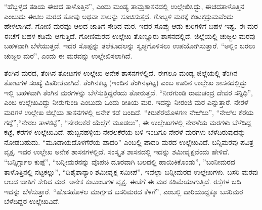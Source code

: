 “ಹೆಬ್ಬಳ್ಳದ ತಡಿಯ ಈಚದ ತಾಳೊತ್ತಿನ”, ಎಂದು ಮಂಡ್ಯ ತಾಮ್ರಶಾಸನದಲ್ಲಿ ಉಲ್ಲೇಖಿಸಿದ್ದು, ಈಚದ\break ತಾಳೊತ್ತಿನ ಎಂಬುದು ಈಚಲ ಮರದ ತೋಪು ಅಥವಾ ಸಾಲನ್ನು ಸೂಚಿಸುತ್ತದೆ. ಗೊಬ್ಬಳಿ ಮರಕ್ಕೆ ಕಂಟಕದ್ರುಮವೆಂದು ಹೇಳಲಾಗಿದೆ. ಗೋಣಿ ಮರವೂ ಆಲದ ಜಾತಿಗೆ ಸೇರಿದ ಮರ. ಇದರ ಸೊಪ್ಪು ಆಡು ಕುರಿಗಳಿಗೆ ಬಹಳ ಇಷ್ಟ. ಈ ಮರ ಈಚೆಗೆ ಬಹಳ ಕಡಿಮೆ ಆಗುತ್ತಿದೆ. ಗೋಣಿಮರದ ಉಲ್ಲೇಖ ತೊಣ್ಣೂರು ಶಾಸನದಲ್ಲಿದೆ. ಜಿಲ್ಲೆಯಲ್ಲಿ ಚುಜ್ಜಲ ಮರವು ಬಹಳವಾಗಿ ಬೆಳೆಯುತ್ತದೆ. ಇದರ ಸೊಪ್ಪನ್ನು ತಲೆಕೂದಲನ್ನು ಸ್ವಚ್ಛಗೊಳಿಸಲು ಉಪಯೋಗಿಸುತ್ತಾರೆ. “ಅಲ್ಲಿಂ ಬರಲು ಚುಜ್ಜಲ ಮರ”, ಎಂದು ಈ ಮರವನ್ನು ಉಲ್ಲೇಖಿಸಲಾಗಿದೆ.

ತೆಂಗಿನ ಮರದ, ತೆಂಗಿನ ತೋಟಗಳ ಉಲ್ಲೇಖ ಅನೇಕ ಶಾಸನಗಳಲ್ಲಿದೆ. ಈಗಲೂ ಮಂಡ್ಯ ಜಿಲ್ಲೆಯಲ್ಲಿ ತೆಂಗಿನ ತೋಟಗಳ ಸಂಖ್ಯೆ ವಿಪರೀತವಾಗಿದೆ. ತೆಂಗಿನಕಟ್ಟ (ಇಂದಿನ ತೆಂಗಿನಘಟ್ಟ) ಎಂಬ ಊರಿನ ಉಲ್ಲೇಖ ಶಾಸನದಲ್ಲಿದ್ದು ಇಲ್ಲಿ ಬಹಳವಾಗಿ ತೆಂಗಿನ ಮರಗಳನ್ನು ಬೆಳೆಸುತ್ತಿದ್ದರೆಂದು ತೋರುತ್ತದೆ. “ನೀರಗುಂಡಿ ರಾಮಚಂದ್ರ ದೇವರ ಸನ್ನಿಧಿ”, ಎಂಬ ಉಲ್ಲೇಖವಿದ್ದು ನೀರುಗುಂಡಿ ಎಂಬುದು ಒಂದು ರೀತಿಯ ಮರ. ಇದನ್ನು ನೀರಂಜಿ ಮರ ಎನ್ನುತ್ತಾರೆ. ನೇರಳೆ ಮರಗಳ ಉಲ್ಲೇಖ ಜಿಲ್ಲೆಯ ಶಾಸನಗಳಲ್ಲಿ ಅನೇಕ ಕಡೆ ಬಂದಿದೆ. “ಕಿರುಕೆರೆಯೊಳಗಣ ನೇಱಿಲು”, “ನೇಱಿಲ ಕೆರೆಯ ಗದ್ದೆ”,\break “ನೇರಲ ತಾಳಕಟ್ಟೆ”, “ನೇರಲಕೆರೆ ಯೆಲ್ಲೆಗೆ ಮೂಡಲು”, ಈ ಉಲ್ಲೇಖಗಳಲ್ಲಿ ನೇರಳೆಯ ಮರಗಳು ಬೆಳೆದಿದ್ದ ಕಟ್ಟೆ, ಕೆರೆಗಳ ಉಲ್ಲೇಖವಿದೆ. ಹುಬ್ಬನಹಳ್ಳಿಯ ನೇರಲಕೆರೆಯ ಬಳಿ ಇಂದಿಗೂ ನೇರಳೆ ಮರಗಳು ಬೆಳೆದಿರುವುದನ್ನು ನೋಡಬಹುದು. “ಮೂಡಾಯದೊಳಗೆರೆಯ ಪಾದರಿ” ಎಂಬಲ್ಲಿ ಪಾದರಿ ಮರದ ಉಲ್ಲೇಖವಿದೆ. ಬನ್ನಿಮರವು ಪವಿತ್ರ ವೃಕ್ಷ. ಇದರ ಉಲ್ಲೇಖ ಅನೇಕ ಶಾಸನಗಳಲ್ಲಿದೆ. ಸಂಸ್ಕೃತ ಶಾಸನದಲ್ಲಿ ಇದನ್ನು ಶಮೀವೃಕ್ಷವೆಂದು ಹೇಳಿದೆ. “ಬನ್ನಿರ್ಗ್ಗಾಲ ಕುಪ್ಪೆ”, “ಬನ್ನೀಮರನನ್ನು ವೊಪಚಿ ದೂರವಾಗಿ ಬಲದಲ್ಲಿ ಹಾಯಿಕಿಕೊಂಡು”, ”ಬಂನೀಮರದ ತಾಳೊತ್ತಿನಲ್ಲಿ ನಟ್ಟಕಲ್ಲು”, “ದಿಶೈಶಾನ್ಯಾಂ ಶಮೀ\-ವೃಕ್ಷ ಸಮೀಪೆ”, ಇವೆಲ್ಲಾ ಬನ್ನೀಮರದ ಉಲ್ಲೇಖಗಳು. ಬಸರಿ ಮರವು ಆಲದ ಜಾತಿಗೆ ಸೇರಿದ ಮರ. ಅನೇಕ ಕುಟುಂಬಗಳ ವೃಕ್ಷ. ಈಚೆಗೆ ಈ ಮರ ಕಡಿಮೆಯಾಗುತ್ತಿದೆ. ರಸ್ತೆಗಳ ಬದಿ ಇದನ್ನು ಬೆಳೆಸುತ್ತಾರೆ. “ಹೊಸಹೊಳಲ ಮಾರ್ಗ್ಗದ ಬಸರಿಮರದ ಕೆಳಗೆ”, ಎಂಬಲ್ಲಿ ದಾರಿಯುದ್ದಕ್ಕೂ ಬಸರಿಮರ ಬೆಳೆದಿದ್ದರ ಉಲ್ಲೇಖವಿದೆ.

